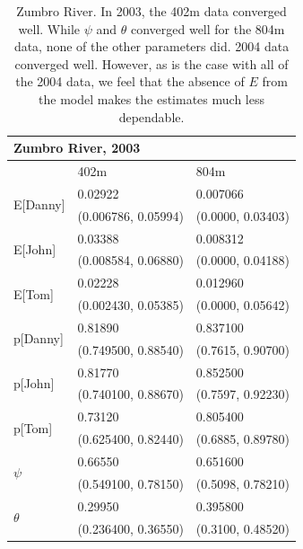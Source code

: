 \documentclass[12pt]{article}
\begin{document}
    \begin{table}
    \caption{Zumbro River. In 2003, the 402m data converged well. While \(\psi\)
    and \(\theta\) converged well for the 804m data, none of the other
    parameters did. 2004 data converged well. However, as is the case with all
    of the 2004 data, we feel that the absence of \(E\) from the model makes the
    estimates much less dependable.}
    \label{Zumbro}
    \begin{center}
    \begin{tabular}{|l|l|l|}
        \hline
        \multicolumn{3}{|l|}{\textbf{Zumbro River, 2003}} \\
        \hline
            & 402m & 804m \\
        \hline
        \multirow{2}{*}{E[Danny]}
            & 0.02922 & 0.007066 \\
            & (0.006786, 0.05994) & (0.0000, 0.03403) \\
        \hline
        \multirow{2}{*}{E[John]}
            & 0.03388 & 0.008312 \\
            & (0.008584, 0.06880) & (0.0000, 0.04188) \\
        \hline
        \multirow{2}{*}{E[Tom]}
            & 0.02228 & 0.012960 \\
            & (0.002430, 0.05385) & (0.0000, 0.05642) \\
        \hline
        \multirow{2}{*}{p[Danny]}
            & 0.81890 & 0.837100 \\
            & (0.749500, 0.88540) & (0.7615, 0.90700) \\
        \hline
        \multirow{2}{*}{p[John]}
            & 0.81770 & 0.852500 \\
            & (0.740100, 0.88670) & (0.7597, 0.92230) \\
        \hline
        \multirow{2}{*}{p[Tom]}
            & 0.73120 & 0.805400 \\
            & (0.625400, 0.82440) & (0.6885, 0.89780) \\
        \hline
        \multirow{2}{*}{\(\psi\)}
            & 0.66550 & 0.651600 \\
            & (0.549100, 0.78150) & (0.5098, 0.78210) \\
        \hline
        \multirow{2}{*}{\(\theta\)}
            & 0.29950 & 0.395800 \\
            & (0.236400, 0.36550) & (0.3100, 0.48520) \\
        \hline
    \end{tabular}
    \end{center}


\end{table}
\end{document}
